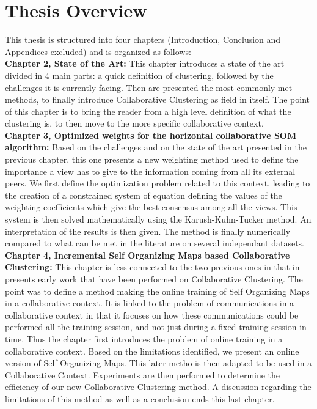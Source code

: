 \section{Thesis Overview}

This thesis is structured into four chapters (Introduction, Conclusion and Appendices excluded) and is organized as follows:\\

\textbf{Chapter 2, State of the Art:} This chapter introduces a state of the art divided in 4 main parts: a quick definition of clustering, followed by the challenges it is currently facing. Then are presented the most commonly met methods, to finally introduce Collaborative Clustering as field in itself. The point of this chapter is to bring the reader from a high level definition of what the clustering is, to then move to the more specific collaborative context.\\

\textbf{Chapter 3, Optimized weights for the horizontal collaborative SOM algorithm:} Based on the challenges and on the state of the art presented in the previous chapter, this one presents a new weighting method used to define the importance a view has to give to the information coming from all its external peers. We first define the optimization problem related to this context, leading to the creation of a constrained system of equation defining the values of the weighting coefficients which give the best consensus among all the views. This system is then solved mathematically using the Karush-Kuhn-Tucker method. An interpretation of the results is then given. The method is finally numerically compared to what can be met in the literature on several independant datasets.\\

\textbf{Chapter 4, Incremental Self Organizing Maps based Collaborative Clustering:} This chapter is less connected to the two previous ones in that in presents early work that have been performed on Collaborative Clustering. The point was to define a method making the online training of Self Organizing Maps in a collaborative context. It is linked to the problem of communications in a collaborative context in that it focuses on how these communications could be performed all the training session, and not just during a fixed training session in time. Thus the chapter first introduces the problem of online training in a collaborative context. Based on the limitations identified, we present an online version of Self Organizing Maps. This later metho is then adapted to be used in a Collaborative Context. Experiments are then performed to determine the efficiency of our new Collaborative Clustering method. A discussion regarding the limitations of this method as well as a conclusion ends this last chapter.\\

